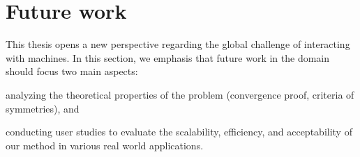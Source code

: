 \section{Future work}

This thesis opens a new perspective regarding the global challenge of interacting with machines. In this section, we emphasis that future work in the domain should focus two main aspects:  \begin{inparaenum}[(a)] \item analyzing the theoretical properties of the problem (convergence proof, criteria of symmetries), and \item  conducting user studies to evaluate the scalability, efficiency, and acceptability of our method in various real world applications. \end{inparaenum}






